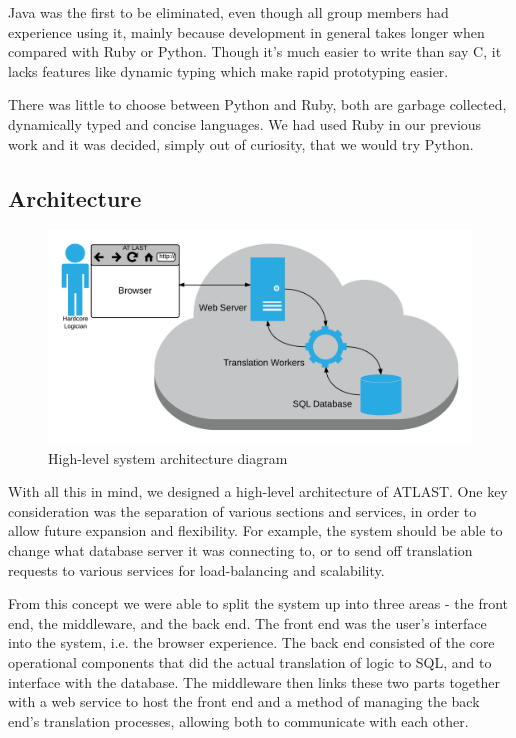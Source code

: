 \documentclass[a4paper, 11pt]{article}
\begin{document}
    Java was the first to be eliminated, even though all group members had
    experience using it, mainly because development in general takes longer when
    compared with Ruby or Python. Though it's much easier to write than say C,
    it lacks features like dynamic typing which make rapid prototyping easier.

    There was little to choose between Python and Ruby, both are garbage
    collected, dynamically typed and concise languages. We had used Ruby in our
    previous work and it was decided, simply out of curiosity, that we would try
    Python.

  \subsection{Architecture}
    \begin{figure}[h!]
      \centering
      \includegraphics[width=\textwidth]{images/architecture.png}
      \caption{High-level system architecture diagram}
    \end{figure}
    With all this in mind, we designed a high-level architecture of ATLAST. One
    key consideration was the separation of various sections and services, in
    order to allow future expansion and flexibility. For example, the system
    should be able to change what database server it was connecting to, or to
    send off translation requests to various services for load-balancing and
    scalability.

    From this concept we were able to split the system up into three areas - the
    front end, the middleware, and the back end. The front end was the user's
    interface into the system, i.e. the browser experience. The back end
    consisted of the core operational components that did the actual translation
    of logic to SQL, and to interface with the database. The middleware then
    links these two parts together with a web service to host the front end and
    a method of managing the back end's translation processes, allowing both to
    communicate with each other.
\end{document}
